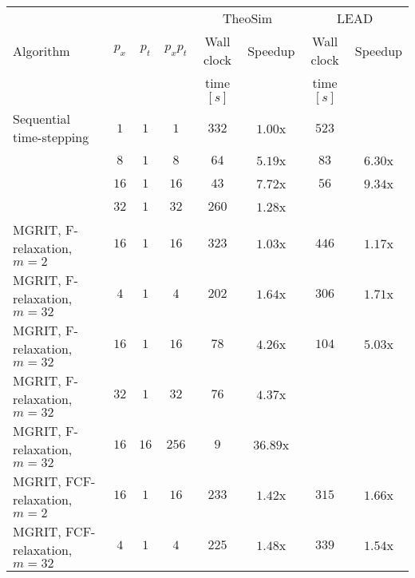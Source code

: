 \documentclass[3p]{elsarticle}
\begin{document}
\FloatBarrier
\begin{table}
	\centering
    \begin{tabular}{ l || c  c  c | c  c | c  c }
                                            &       &       &           & \multicolumn{2}{c|}{TheoSim}  & \multicolumn{2}{c}{LEAD}  \\
        Algorithm                           & $p_x$ & $p_t$ & $p_x p_t$ & Wall clock        & Speedup   & Wall clock    & Speedup   \\
                                            &       &       &           & time $[s]$        &           & time $[s]$    &           \\
        \hline\hline
        Sequential time-stepping            & $1$   & $1$   & $1$       & $332$             & $1.00$x   & $523$     &           \\
                                            & $8$   & $1$   & $8$       & $64$              & $5.19$x   & $83$      & $6.30$x   \\
                                            & $16$  & $1$   & $16$      & $43$              & $7.72$x   & $56$      & $9.34$x   \\
                                            & $32$  & $1$   & $32$      & $260$             & $1.28$x   &           &           \\
        \hline
        MGRIT, F-relaxation, $m = 2$      & $16$  & $1$   & $16$      & $323$             & $1.03$x   & $446$     & $1.17$x   \\
        MGRIT, F-relaxation, $m = 32$     & $4$   & $1$   & $4$       & $202$             & $1.64$x   & $306$     & $1.71$x   \\
        MGRIT, F-relaxation, $m = 32$     & $16$  & $1$   & $16$      & $78$              & $4.26$x   & $104$     & $5.03$x   \\
        MGRIT, F-relaxation, $m = 32$     & $32$  & $1$   & $32$      & $76$              & $4.37$x   &           &           \\
        MGRIT, F-relaxation, $m = 32$     & $16$  & $16$  & $256$     & $9$               & $36.89$x  &           &           \\
        \hline
        MGRIT, FCF-relaxation, $m = 2$    & $16$  & $1$   & $16$      & $233$             & $1.42$x   & $315$     & $1.66$x   \\
        MGRIT, FCF-relaxation, $m = 32$   & $4$   & $1$   & $4$       & $225$             & $1.48$x   & $339$     & $1.54$x   \\

\end{tabular}
\end{table}
\end{document}
